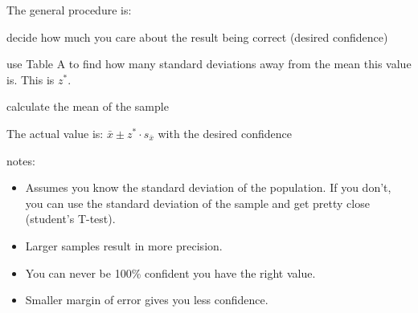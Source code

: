 \documentclass[landscape]{exam}
\begin{document}
  The general procedure is:
  \begin{enumerate*}
    \item decide how much you care about the result being correct (desired
      confidence)

    \item use Table A to find how many standard deviations away from the mean
      this value is. This is $z^*$.

    \item calculate the mean of the sample

    \item The actual value is: $\bar{x} \pm z^* \cdot s_{\bar{x}}$ with the
      desired confidence

  \end{enumerate*}

  notes:
  \begin{itemize}
    \item Assumes you know the standard deviation of the population. If you
      don't, you can use the standard deviation of the sample and get pretty
      close (student's T-test).

    \item Larger samples result in more precision.

    \item You can never be 100\% confident you have the right value.

    \item Smaller margin of error gives you less confidence.
  \end{itemize}
\end{document}

